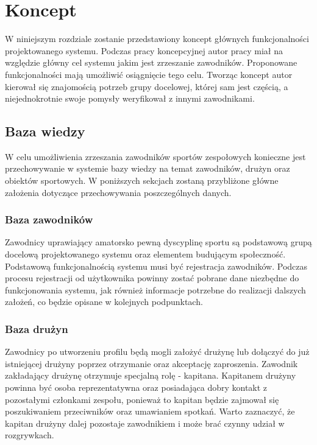 \chapter{Koncept}

W niniejszym rozdziale zostanie przedstawiony koncept głównych funkcjonalności projektowanego systemu. Podczas pracy koncepcyjnej autor pracy miał na względzie główny cel systemu jakim jest zrzeszanie zawodników. Proponowane funkcjonalności mają umożliwić osiągnięcie tego celu. Tworząc koncept autor kierował się znajomością potrzeb grupy docelowej, której sam jest częścią, a niejednokrotnie swoje pomysły weryfikował z innymi zawodnikami.
  
  
\section{Baza wiedzy}

W celu umożliwienia zrzeszania zawodników sportów zespołowych konieczne jest przechowywanie w systemie bazy wiedzy na temat zawodników, drużyn oraz obiektów sportowych. W poniższych sekcjach zostaną przybliżone główne założenia dotyczące przechowywania poszczególnych danych.
  
\subsection{Baza zawodników}

Zawodnicy uprawiający amatorsko pewną dyscyplinę sportu są podstawową grupą docelową projektowanego systemu oraz elementem budującym społeczność. Podstawową funkcjonalnością systemu musi być rejestracja zawodników. Podczas procesu rejestracji od użytkownika powinny zostać pobrane dane niezbędne do funkcjonowania systemu, jak również informacje potrzebne do realizacji dalszych założeń, co będzie opisane w kolejnych podpunktach.

\subsection{Baza drużyn}

Zawodnicy po utworzeniu profilu będą mogli założyć drużynę lub dołączyć do już istniejącej drużyny poprzez otrzymanie oraz akceptację zaproszenia. Zawodnik zakładający drużynę otrzymuje specjalną rolę - kapitana. Kapitanem drużyny powinna być osoba reprezentatywna oraz posiadająca dobry kontakt z pozostałymi członkami zespołu, ponieważ to kapitan będzie zajmował się poszukiwaniem przeciwników oraz umawianiem spotkań. Warto zaznaczyć, że kapitan drużyny dalej pozostaje zawodnikiem i może brać czynny udział w rozgrywkach. 

